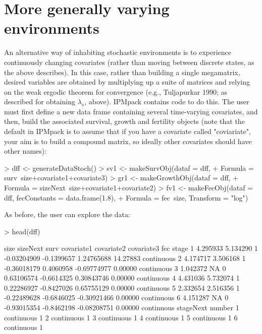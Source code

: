 \documentclass{article}
\begin{document}

\section{More generally varying environments}

An alternative way of inhabiting stochastic environments is to experience continuously changing covariates (rather than moving between discrete states, as the above describes). In this case, rather than building a single megamatrix, desired variables are obtained by multiplying up a suite of matrices and relying on the weak
ergodic theorem for convergence (e.g., Tuljapurkar 1990; as described for obtaining $\lambda_s$, above). IPMpack contains code to do this. The user must first define a new data frame containing several time-varying covariates, and then, build the associated survival, growth and fertility objects (note that the default in IPMpack is to assume that if you have a covariate called "coviariate", your aim is to build a compound matrix, so ideally other covariates should have other names): 
\begin{Schunk}
\begin{Sinput}
> dff <- generateDataStoch()
> sv1 <- makeSurvObj(dataf = dff, 
+                           Formula = surv~size+covariate1+covariate3)
> gr1 <- makeGrowthObj(dataf = dff, 
+                              Formula = sizeNext~size+covariate1+covariate2)
> fv1 <- makeFecObj(dataf = dff, fecConstants = data.frame(1.8), 
+                   Formula = fec~size, Transform = "log")
\end{Sinput}
\end{Schunk}
As before, the user can explore the data: 
\begin{Schunk}
\begin{Sinput}
> head(dff)
\end{Sinput}
\begin{Soutput}
      size sizeNext surv  covariate1 covariate2  covariate3      fec      stage
1 4.295933 5.134290    1 -0.03204909 -0.1399657  1.24765688 14.27883 continuous
2 4.174717 3.506168    1 -0.36018179  0.4060958 -0.69774977  0.00000 continuous
3 1.042372       NA    0  0.63106574 -0.6614325  0.30843746  0.00000 continuous
4 4.431036 5.732074    1  0.22286927 -0.8427026  0.65755129  0.00000 continuous
5 2.332654 2.516356    1 -0.22489628 -0.6846025 -0.30921466  0.00000 continuous
6 4.151287       NA    0 -0.93015354 -0.8462198 -0.08208751  0.00000 continuous
   stageNext number
1 continuous      1
2 continuous      1
3 continuous      1
4 continuous      1
5 continuous      1
6 continuous      1
\end{Soutput}
\end{Schunk}
\end{document}
